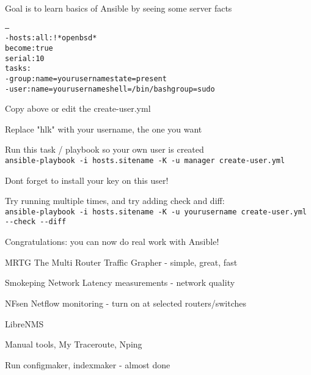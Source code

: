 \documentclass[Screen16to9,17pt]{foils}
\begin{document}
\vskip 5mm
\centerline{Goal is to learn basics of Ansible by seeing some server facts}



\begin{alltt}\footnotesize
---
- hosts: all:!*openbsd*
  become: true
  serial: 10
tasks:
  - group: name=yourusername state=present
  - user: name=yourusername shell=/bin/bash group=sudo
\end{alltt}

\begin{list2}
\item Copy above or edit the create-user.yml
\item Replace "hlk" with your username, the one you want
\item Run this task / playbook so your own user is created\\
\verb+ansible-playbook -i hosts.sitename -K -u manager create-user.yml+
\item Dont forget to install your key on this user!
\item Try running multiple times, and try adding check and diff:\\
{\footnotesize\verb+ansible-playbook -i hosts.sitename -K -u yourusername create-user.yml --check --diff+}
\end{list2}

\vskip 5mm
\centerline{Congratulations: you can now do real work with Ansible!}



\begin{slidelist}
\item MRTG The Multi Router Traffic Grapher - simple, great, fast\\
\item Smokeping Network Latency measurements - network quality\\
\item NFsen Netflow monitoring - turn on at selected routers/switches
\item LibreNMS 
\item Manual tools, My Traceroute, Nping
\end{slidelist}



\centerline{Run configmaker, indexmaker - almost done}
\end{document}
